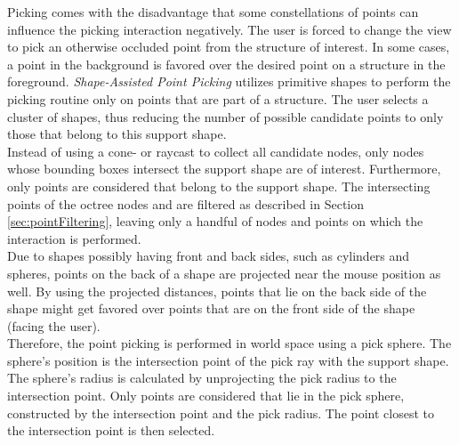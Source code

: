 Picking comes with the disadvantage that some constellations of points can influence the picking interaction negatively. The user is forced to change the view to pick an otherwise occluded point from the structure of interest. In some cases, a point in the background is favored over the desired point on a structure in the foreground. \textit{Shape-Assisted Point Picking} utilizes primitive shapes to perform the picking routine only on points that are part of a structure. The user selects a cluster of shapes, thus reducing the number of possible candidate points to only those that belong to this support shape. 
\\ 
Instead of using a cone- or raycast to collect all candidate nodes, only nodes whose bounding boxes intersect the support shape are of interest. Furthermore, only points are considered that belong to the support shape. The intersecting points of the octree nodes and are filtered as described in Section \ref{sec:pointFiltering}, leaving only a handful of nodes and points on which the interaction is performed. 
\\
Due to shapes possibly having front and back sides, such as cylinders and spheres, points on the back of a shape are projected near the mouse position as well. By using the projected distances, points that lie on the back side of the shape might get favored over points that are on the front side of the shape (facing the user). 
\\
Therefore, the point picking is performed in world space using a pick sphere. The sphere's position is the intersection point of the pick ray with the support shape. The sphere's radius is calculated by unprojecting the pick radius to the intersection point. Only points are considered that lie in the pick sphere, constructed by the intersection point and the pick radius. The point closest to the intersection point is then selected. 
\\

